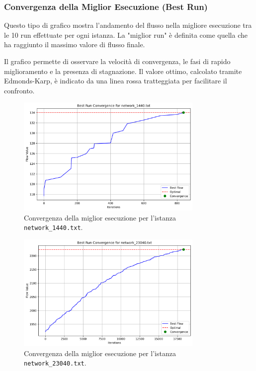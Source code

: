 \documentclass[12pt,a4paper]{article}
\begin{document}
\subsubsection{Convergenza della Miglior Esecuzione (Best Run)}

Questo tipo di grafico mostra l'andamento del flusso nella migliore esecuzione tra le 10 run effettuate per ogni istanza. La "miglior run" è definita come quella che ha raggiunto il massimo valore di flusso finale.

Il grafico permette di osservare la velocità di convergenza, le fasi di rapido miglioramento e la presenza di stagnazione. Il valore ottimo, calcolato tramite Edmonds-Karp, è indicato da una linea rossa tratteggiata per facilitare il confronto.

\begin{figure}[H]
    \centering
    \includegraphics[width=0.8\textwidth]{results/network_1440_best_convergence.png}
    \caption{Convergenza della miglior esecuzione per l'istanza \texttt{network\_1440.txt}.}
    \label{fig:best_run_1440}
\end{figure}

\begin{figure}[H]
    \centering
    \includegraphics[width=0.8\textwidth]{results/network_23040_best_convergence.png}
    \caption{Convergenza della miglior esecuzione per l'istanza \texttt{network\_23040.txt}.}
    \label{fig:best_run_23040}
\end{figure}
\end{document}
